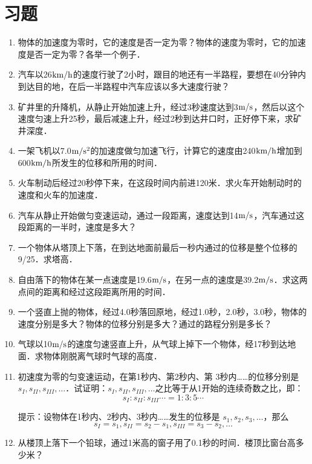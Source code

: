 \section*{习题}
\begin{enumerate}
	\item 物体的加速度为零时，它的速度是否一定为零？物体的速度为零时，它的加速度是否一定为零？各举一个例子．
	\item 汽车以26$\text{km}/\text{h}$的速度行驶了2小时，跟目的地还有一半路程，要想在40分钟内到达目的地，在后一半路程中汽车应该以多大速度行驶？
	\item 矿井里的升降机，从静止开始加速上升，经过3秒速度达到3$\text{m}/\text{s}$，然后以这个速度匀速上升25秒，最后减速上升，经过2秒到达井口时，正好停下来，求矿井深度．
	\item 一架飞机以7.0$\text{m}/\text{s}^2$的加速度做匀加速飞行，计算它的速度由240$\text{km}/\text{h}$增加到600$\text{km}/\text{h}$所发生的位移和所用的时间．
	\item 火车制动后经过20秒停下来，在这段时间内前进120米．求火车开始制动时的速度和火车的加速度．
	\item 汽车从静止开始做匀变速运动，通过一段距离，速度达到14$\text{m}/\text{s}$，汽车通过这段距离的一半时，速度是多大？
	\item 一个物体从塔顶上下落，在到达地面前最后一秒内通过的位移是整个位移的9/25．求塔高．
	\item 自由落下的物体在某一点速度是19.6$\text{m}/\text{s}$，在另一点的速度是39.2$\text{m}/\text{s}$．求这两点间的距离和经过这段距离所用的时间．
	\item 一个竖直上抛的物体，经过4.0秒落回原地，经过1.0秒，2.0秒，3.0秒，物体的速度分别是多大？物体的位移分别是多大？通过的路程分别是多长？
	\item 气球以10$\text{m}/\text{s}$的速度匀速竖直上升，从气球上掉下一个物体，经17秒到达地面．求物体刚脱离气球时气球的高度．
	\item 初速度为零的匀变速运动，在第1秒内、第2秒内、第
	3秒内……的位移分别是$s_I,s_{II},s_{III},\ldots$．试证明：$s_I,s_{II},s_{III},\ldots$之比等于从1开始的连续奇数之比，即：
$$s_I:s_{II}:s_{III}\cdots=1:3:5\cdots$$

提示：设物体在1秒内、2秒内、3秒内……发生的位移是
$s_1,s_2,s_3,\ldots$，那么
$$s_I=s_1, s_{II}=s_2-s_1, s_{III}=s_3-s_2,\ldots$$
	\item 从楼顶上落下一个铅球，通过1米高的窗子用了0.1秒的时间．楼顶比窗台高多少米？
\end{enumerate}


































